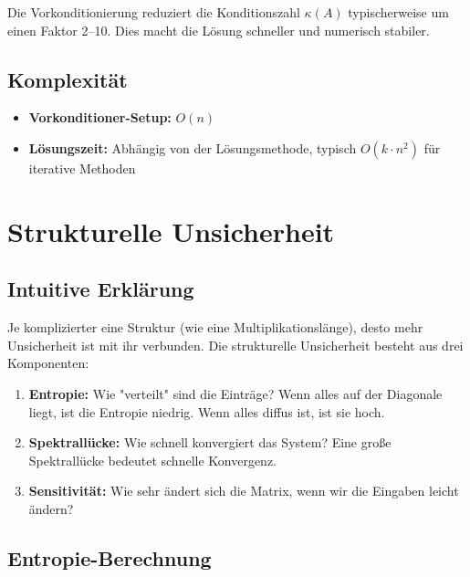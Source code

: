 \documentclass[a4paper,12pt]{article}
\begin{document}
Die Vorkonditionierung reduziert die Konditionszahl $\kappa(A)$ typischerweise um einen Faktor 2--10. Dies macht die Lösung schneller und numerisch stabiler.

\subsection{Komplexität}

\begin{itemize}
\item \textbf{Vorkonditioner-Setup:} $O(n)$
\item \textbf{Lösungszeit:} Abhängig von der Lösungsmethode, typisch $O(k \cdot n^2)$ für iterative Methoden
\end{itemize}


\section{Strukturelle Unsicherheit}

\subsection{Intuitive Erklärung}

Je komplizierter eine Struktur (wie eine Multiplikationslänge), desto mehr Unsicherheit ist mit ihr verbunden. Die strukturelle Unsicherheit besteht aus drei Komponenten:

\begin{enumerate}
\item \textbf{Entropie:} Wie "verteilt" sind die Einträge? Wenn alles auf der Diagonale liegt, ist die Entropie niedrig. Wenn alles diffus ist, ist sie hoch.

\item \textbf{Spektrallücke:} Wie schnell konvergiert das System? Eine große Spektrallücke bedeutet schnelle Konvergenz.

\item \textbf{Sensitivität:} Wie sehr ändert sich die Matrix, wenn wir die Eingaben leicht ändern?
\end{enumerate}

\subsection{Entropie-Berechnung}
\end{document}
